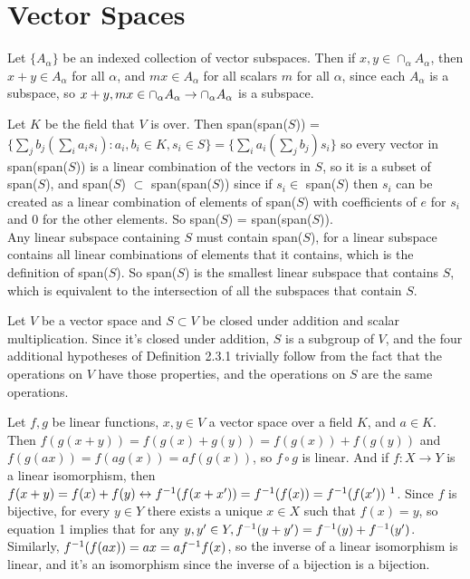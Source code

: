 \documentclass[11pt, oneside]{article}   	%
\begin{document}
\section{Vector Spaces}
\be
\item Let $\{A_\alpha\}$ be an indexed collection of vector subspaces. Then if $x, y \in \cap_\alpha A_\alpha$, then $x + y \in A_\alpha$ for all $\alpha$, and $mx \in A_\alpha$ for all scalars $m$ for all $\alpha$, since each $A_\alpha$ is a subspace, so $x + y, mx \in \cap_\alpha A_\alpha \rightarrow \cap_\alpha A_\alpha$ is a subspace.
\item Let $K$ be the field that $V$ is over. Then span(span($S$)) = $\{\sum_j b_j (\sum_i a_is_i): a_i, b_i \in K, s_i \in S\} = \{\sum_i a_i (\sum_j b_j) s_i\}$ so every vector in span(span($S$)) is a linear combination of the vectors in $S$, so it is a subset of span($S$), and span($S$) $\subset$ span(span($S$)) since if $s_i \in$ span($S$) then $s_i$ can be created as a linear combination of elements of span($S$) with coefficients of $e$ for $s_i$ and 0 for the other elements. So span($S$) = span(span($S$)). \\
Any linear subspace containing $S$ must contain span($S$), for a linear subspace contains all linear combinations of elements that it contains, which is the definition of span($S$). So span($S$) is the smallest linear subspace that contains $S$, which is equivalent to the intersection of all the subspaces that contain $S$.
\item Let $V$ be a vector space and $S \subset V$ be closed under addition and scalar multiplication. Since it's closed under addition, $S$ is a subgroup of $V$, and the four additional hypotheses of Definition 2.3.1 trivially follow from the fact that the operations on $V$ have those properties, and the operations on $S$ are the same operations.
\item Let $f,g$ be linear functions, $x, y \in V$ a vector space over a field $K$, and $a \in K$. Then $f(g(x + y)) = f(g(x) + g(y)) = f(g(x)) + f(g(y))$ and $f(g(ax)) = f(ag(x)) = af(g(x))$, so $f \circ g$ is linear. And if $f: X \to Y$ is a linear isomorphism, then $f(x+y) = f(x) + f(y) \leftrightarrow f^{-1}(f(x + x')) = f^{-1}(f(x)) = f^{-1}(f(x')) \ ^1$. Since $f$ is bijective, for every $y \in Y$ there exists a unique $x \in X$ such that $f(x) = y$, so equation 1 implies that for any $y, y' \in Y, f^{-1}(y + y') = f^{-1}(y) + f^{-1}(y')$. Similarly, $f^{-1}(f(ax)) = ax = af^{-1} f(x)$, so the inverse of a linear isomorphism is linear, and it's an isomorphism since the inverse of a bijection is a bijection.
\end{document}
